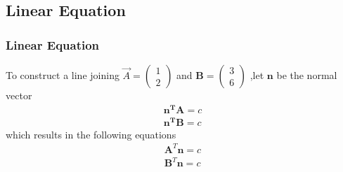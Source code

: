 \documentclass{beamer}
\providecommand{\brak}[1]{\ensuremath{\left(#1\right)}}
\theoremstyle{remark}
\providecommand{\norm}[1]{\lVert#1\rVert}
\newcommand{\myvec}[1]{\ensuremath{\begin{pmatrix}#1\end{pmatrix}}}
\let\vec\mathbf
\numberwithin{equation}{section}
\begin{document}
\subsection{Linear Equation}
\begin{frame}
\frametitle{Linear Equation}
To construct a line joining $\Vec{A}=\myvec{1\\2}$ and $\vec{B}=\myvec{3\\6}$ ,let $\vec{n}$ be the normal vector
%
\begin{align}
\vec{n^T} \vec {A}=c \label{eq:1} \\
\vec{n^T} \vec {B}=c  \label{eq:2} 
\end{align}
%
which results in the following equations
%
\begin{align}
\vec{A}^T \vec {n}=c \\
\vec{B}^T \vec {n}=c  \\
\end{align}
\end{frame}
\end{document}
